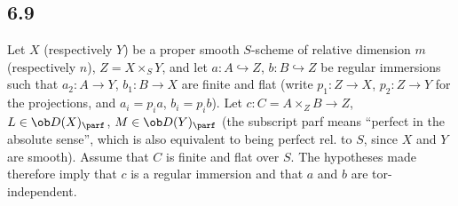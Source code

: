 \subsection*{6.9}

Let $X$ (respectively $Y$) be a proper smooth $S$-scheme of relative dimension $m$ (respectively $n$), $Z=X\times_S Y$, and let $a:A\hookrightarrow Z$, $b:B\hookrightarrow Z$ be regular immersions such that $a_2:A\to Y$, $b_1:B\to X$ are finite and flat (write $p_1:Z\to X$, $p_2:Z\to Y$ for the projections, and $a_i=p_i a$, $b_i=p_i b$). Let $c:C=A\times_Z B\to Z$, $L\in\ob D(X)_{\parf}$, $M\in\ob D(Y)_{\parf}$ (the subscript parf means ``perfect in the absolute sense'', which is also equivalent to being perfect rel. to $S$, since $X$ and $Y$ are smooth). Assume that $C$ is finite and flat over $S$. The hypotheses made therefore imply that $c$ is a regular immersion and that $a$ and $b$ are tor-independent.

